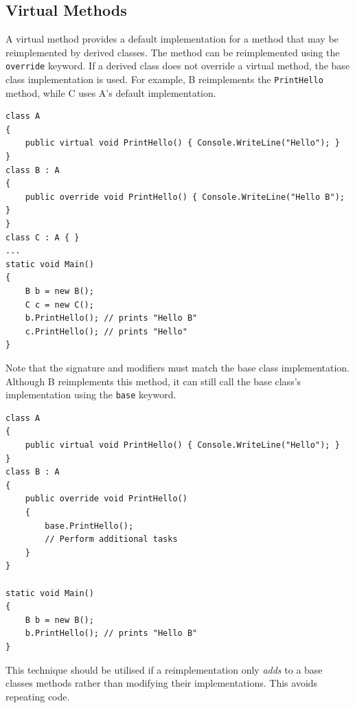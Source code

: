 \documentclass{article}
\begin{document}
\subsection{Virtual Methods}
A virtual method provides a default implementation for a method that
may be reimplemented by derived classes. The method can be
reimplemented using the \texttt{override} keyword. If a
derived class does not override a virtual method, the base class
implementation is used. For example, B reimplements the
\texttt{PrintHello} method, while C uses A's default
implementation.
\begin{verbatim}
class A
{
    public virtual void PrintHello() { Console.WriteLine("Hello"); }
}
class B : A
{
    public override void PrintHello() { Console.WriteLine("Hello B"); }
}
class C : A { }
...
static void Main()
{
    B b = new B();
    C c = new C();
    b.PrintHello(); // prints "Hello B"
    c.PrintHello(); // prints "Hello"
}
\end{verbatim}
Note that the signature and modifiers must match the base class
implementation. Although B reimplements this method, it can still call
the base class's implementation using the \texttt{base}
keyword.
\begin{verbatim}
class A
{
    public virtual void PrintHello() { Console.WriteLine("Hello"); }
}
class B : A
{
    public override void PrintHello()
    {
        base.PrintHello();
        // Perform additional tasks
    }
}

static void Main()
{
    B b = new B();
    b.PrintHello(); // prints "Hello B"
}
\end{verbatim}
This technique should be utilised if a reimplementation only
\textit{adds} to a base classes methods rather than modifying their
implementations. This avoids repeating code.
\end{document}
